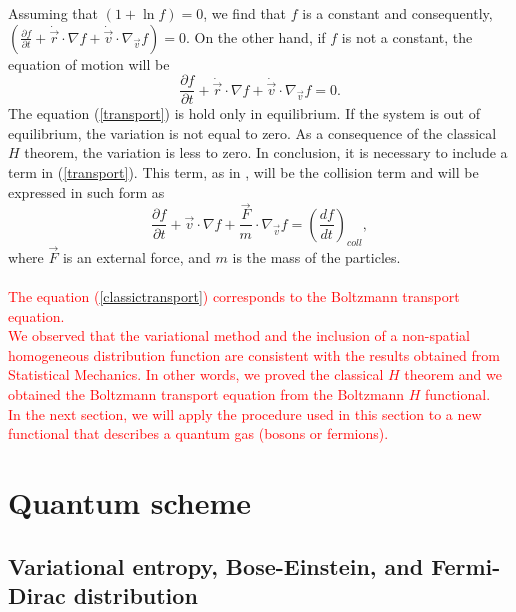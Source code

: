 \documentclass{article}
\begin{document}
Assuming that $(1+\ln f)=0$, we find that $f$ is a constant and consequently, $(\frac{\partial f}{\partial t}+\dot{\vec{r}}\cdot \nabla f+\dot{\vec{v}}\cdot \nabla_{\vec{v}} f)=0$. On the other hand, if $f$ is not a constant, the equation of motion will be
\begin{equation}
    \frac{\partial f}{\partial t}+\dot{\vec{r}}\cdot \nabla f+\dot{\vec{v}}\cdot \nabla_{\vec{v}} f=0.\label{transport}
\end{equation}
The equation (\ref{transport}) is hold only in equilibrium. If the system is out of equilibrium, the variation is not equal to zero. As a consequence of the classical $H$ theorem, the variation is less to zero. In conclusion, it is necessary to include a term in (\ref{transport}). This term, as in \cite{huang}, will be the collision term and will be expressed in such form as
\begin{equation}
    \frac{\partial f}{\partial t}+\vec{v}\cdot \nabla f+\frac{\vec{F}}{m}\cdot \nabla_{\vec{v}} f=\left( \frac{df}{dt} \right)_{coll}, \label{classictransport}
\end{equation}
where $\vec{F}$ is an external force, and $m$ is the mass of the particles.\\
\\
\textcolor{red}{The equation (\ref{classictransport}) corresponds to the Boltzmann transport equation. \\
We observed that the variational method and the inclusion of a non-spatial homogeneous distribution function are consistent with the results obtained from Statistical Mechanics. In other words, we proved the classical $H$ theorem and we obtained the Boltzmann transport equation from the Boltzmann $H$ functional.\\
In the next section, we will apply the procedure used in this section to a new functional that describes a quantum gas (bosons or fermions).}


\section{Quantum scheme}
\subsection{Variational entropy, Bose-Einstein, and Fermi-Dirac distribution}
\end{document}
